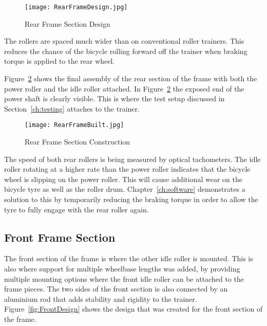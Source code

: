 \begin{figure}[H]
	\centering
	\texttt{[image: RearFrameDesign.jpg]}
	\caption{Rear Frame Section Design}
	\label{fig:RearDesign}
\end{figure}

\vspace*{-0.5cm}

The rollers are spaced much wider than on conventional roller trainers. This reduces the chance of the bicycle rolling forward off the trainer when braking torque is applied to the rear wheel.

Figure~\ref{fig:RearBuilt} shows the final assembly of the rear section of the frame with both the power roller and the idle roller attached. In Figure~\ref{fig:RearBuilt} the exposed end of the power shaft is clearly visible. This is where the test setup discussed in Section~\ref{ch:testing} attaches to the trainer.

\begin{figure}[H]
	\centering
	\texttt{[image: RearFrameBuilt.jpg]}
	\caption{Rear Frame Section Construction}
	\label{fig:RearBuilt}
\end{figure}

\vspace*{-0.8cm}

The speed of both rear rollers is being measured by optical tachometers. The idle roller rotating at a higher rate than the power roller indicates that the bicycle wheel is slipping on the power roller. This will cause additional wear on the bicycle tyre as well as the roller drum. Chapter~\ref{ch:software} demonstrates a solution to this by temporarily reducing the braking torque in order to allow the tyre to fully engage with the rear roller again. 

\vspace*{-0.3cm}

\subsection{Front Frame Section}

The front section of the frame is where the other idle roller is mounted. This is also where support for multiple wheelbase lengths was added, by providing multiple mounting options where the front idle roller can be attached to the frame pieces. The two sides of the front section is also connected by an aluminium rod that adds stability and rigidity to the trainer. Figure~\ref{fig:FrontDesign} shows the design that was created for the front section of the frame.

